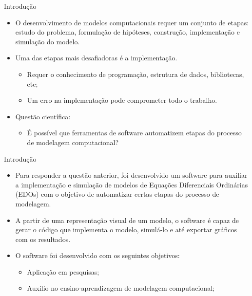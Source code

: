 \begin{frame}{Introdução}
    \begin{itemize}
        \item O desenvolvimento de modelos computacionais requer um conjunto de etapas: estudo do problema, formulação de hipóteses, construção, implementação e simulação do modelo. 
        \item Uma das etapas mais desafiadoras é a implementação.
        \begin{itemize}
            \item Requer o conhecimento de programação, estrutura de dados, bibliotecas, etc; 
            \item Um erro na implementação pode comprometer todo o trabalho. 
        \end{itemize}
        \item Questão científica: 
        \begin{itemize}
            \item É possível que ferramentas de software automatizem etapas do processo de modelagem computacional?
        \end{itemize}
    \end{itemize}
\end{frame}

\begin{frame}{Introdução}
    \begin{itemize}
        \item Para responder a questão anterior, foi desenvolvido um software para auxiliar a implementação e simulação de modelos de Equações Diferenciais Ordinárias (EDOs) com o objetivo de automatizar certas etapas do processo de modelagem. 
        \item A partir de uma representação visual de um modelo, o software é capaz de gerar o código que implementa o modelo, simulá-lo e até exportar gráficos com os resultados.
        \item O software foi desenvolvido com os seguintes objetivos:
        \begin{itemize}
            \item Aplicação em pesquisas;
            \item Auxílio no ensino-aprendizagem de modelagem computacional;
        \end{itemize}
    \end{itemize}
\end{frame}
